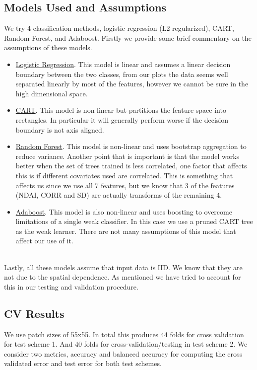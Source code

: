 \documentclass[11pt, letterpaper, journal]{IEEEtran}
\begin{document}
\subsection{Models Used and Assumptions}
We try 4 classification methods, logistic regression (L2 regularized), CART, Random Forest, and Adaboost. Firstly we provide some brief commentary on the assumptions of these models.
\begin{itemize}
    \item \underline{Logistic Regression}. This model is linear and assumes a linear decision boundary between the two classes, from our plots the data seems well separated linearly by most of the features, however we cannot be sure in the high dimensional space.
    \item \underline{CART}. This model is non-linear but partitions the feature space into rectangles. In particular it will generally perform worse if the decision boundary is not axis aligned. 
    \item \underline{Random Forest}. This model is non-linear and uses bootstrap aggregation to reduce variance. Another point that is important is that the model works better when the set of trees trained is less correlated, one factor that affects this is if different covariates used are correlated. This is something that affects us since we use all 7 features, but we know that 3 of the features (NDAI, CORR and SD) are actually transforms of the remaining 4.
    \item \underline{Adaboost}. This model is also non-linear and uses boosting to overcome limitations of a single weak classifier. In this case we use a pruned CART tree as the weak learner. There are not many assumptions of this model that affect our use of it.
\end{itemize}
\\
Lastly, all these models assume that input data is IID. We know that they are not due to the spatial dependence. As mentioned we have tried to account for this in our testing and validation procedure. 

\subsection{CV Results}
We use patch sizes of 55x55. In total this produces 44 folds for cross validation for test scheme 1. And 40 folds for cross-validation/testing in test scheme 2. We consider two metrics, accuracy and balanced accuracy for computing the cross validated error and test error for both test schemes. 
\end{document}

